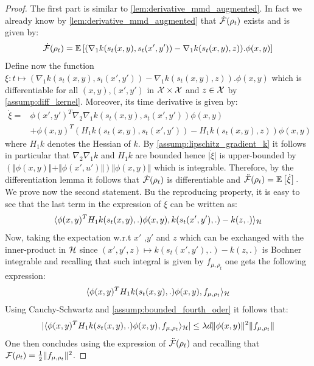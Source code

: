 \begin{proof}
The first part is similar to \cref{lem:derivative_mmd_augmented}. In fact we already know by \cref{lem:derivative_mmd_augmented} that $\dot{{{\mathcal F}}}(\rho_t)$ exists and is given by:
\[
\dot{{{\mathcal F}}}(\rho_t) = \mathbb{E}\left[(\nabla_1 k(s_t(x,y),s_t(x',y'))-\nabla_1 k(s_t(x,y),z)).\phi(x,y)\right]
\]
Define now the function $\xi : t\mapsto (\nabla_1 k(s_t(x,y),s_t(x',y'))-\nabla_1 k(s_t(x,y),z)).\phi(x,y)$ which is differentiable for all $(x,y)$,$(x',y')$ in ${{\mathcal X}}\times {{\mathcal X}}$ and $z\in {{\mathcal X}}$ by \cref{assump:diff_kernel}. Moreover, its time derivative is given by:
\begin{align}
	\dot{\xi} =& \phi(x',y')^T \nabla_2\nabla_1k(s_t(x,y),s_t(x',y'))\phi(x,y) \\
	&+ \phi(x,y)^T(H_1k(s_t(x,y),s_t(x',y') ) - H_1k(s_t(x,y),z ))\phi(x,y)  
\end{align}
where $H_1 k$ denotes the Hessian of $k$. By \cref{assump:lipschitz_gradient_k} it follows in particular that $\nabla_2\nabla_1k$ and $H_1k$ are bounded hence $\vert \dot{\xi} \vert$  is upper-bounded by $ (\Vert \phi(x,y) \Vert + \Vert\phi(x',u') \Vert)\Vert \phi(x,y)\Vert$ which is integrable.
Therefore, by the differentiation lemma \cite[Theorem 6.28]{Klenke:2008} it follows that $\dot{{{\mathcal F}}}(\rho_t)$ is differentiable and $\ddot{{{\mathcal F}}}(\rho_t) = \mathbb{E}\left[\dot{\xi}\right].$
We prove now the second statement. Bu the reproducing property, it is easy to see that the last term in the expression of $\dot{\xi}$ can be written as:
\[
\langle \phi(x,y)^TH_1 k(s_t(x,y),.)\phi(x,y), k(s_t(x',y'),.)-  k(z,.)\rangle_{{{\mathcal H}}} 
\]
Now, taking the expectation w.r.t $x'$  ,$y'$ and $z$ which can be exchanged with the inner-product in ${{\mathcal H}}$ since  $(x',y',z)\mapsto k(s_t(x',y'),.)-  k(z,.)$ is Bochner integrable \cite[Definition 1, Theorem 6]{Retherford:1978} and recalling that such integral is given by $f_{\mu,\rho_t}$  one gets the following expression:
\[
 \langle  \phi(x,y)^TH_1 k(s_t(x,y),.)\phi(x,y), f_{\mu,\rho_t} \rangle_{{{\mathcal H}}}
\]
Using Cauchy-Schwartz and \cref{assump:bounded_fourth_oder} it follows that:
\[
\vert \langle  \phi(x,y)^TH_1 k(s_t(x,y),.)\phi(x,y), f_{\mu,\rho_t} \rangle_{{{\mathcal H}}}\vert \leq \lambda d\Vert \phi(x,y)\Vert^2 \Vert f_{\mu,\rho_t}\Vert 
\]
One then concludes using the expression of $\ddot{{{\mathcal F}}}(\rho_t)$ and recalling that ${{\mathcal F}}(\rho_t) = \frac{1}{2}\Vert f_{\mu,\rho_t} \Vert^2$.
\end{proof}

